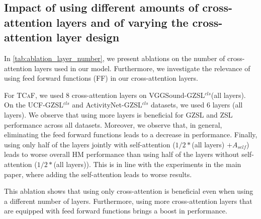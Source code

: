 \documentclass[runningheads]{llncs}
\newcommand{\modelName}{\textsc{TCaF}\xspace}
\newcommand{\activity}{{ActivityNet-GZSL$^{cls}$}\xspace}
\newcommand{\ucf}{{UCF-GZSL$^{cls}$}\xspace}
\newcommand{\vgg}{{VGGSound-GZSL$^{cls}$}\xspace}
\begin{document}
\subsection{Impact of using different amounts of cross-attention layers and of varying the cross-attention layer design}
\label{section:layer_ablation}
In \cref{tab:ablation_layer_number}, we present ablations on the number of cross-attention layers used in our model. Furthermore, we investigate the relevance of using feed forward functions (FF) in our cross-attention layers.

For \modelName, we used 8 cross-attention layers on \vgg (all layers). On the \ucf and \activity datasets, we used 6 layers (all layers). We observe that using more layers is beneficial for GZSL and ZSL performance across all datasets. Moreover, we observe that, in general, eliminating the feed forward functions leads to a decrease in performance. 
Finally, using only half of the layers jointly with self-attention ($1/2*$(all layers) $+A_{self}$) leads to worse overall HM performance than using half of the layers without self-attention ($1/2*$(all layers)). This is in line with the experiments in the main paper, where adding the self-attention leads to worse results. 

This ablation shows that using only cross-attention is beneficial even when using a different number of layers. Furthermore, using more cross-attention layers that are equipped with feed forward functions brings a boost in performance.
\end{document}
